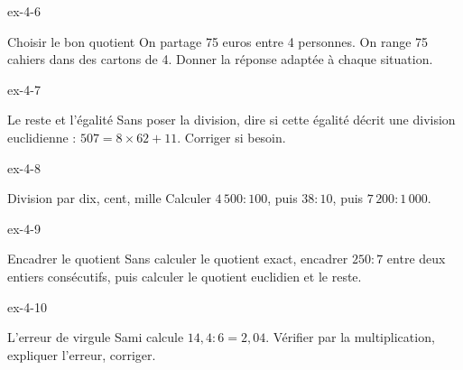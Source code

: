 \begin{blocLivre}{ex-4-6}\begin{exercice}[2]{Choisir le bon quotient}
On partage 75 euros entre 4 personnes. On range 75 cahiers dans des cartons de 4. Donner la réponse adaptée à chaque situation.
\end{exercice}\end{blocLivre}
\begin{blocLivre}{ex-4-7}\begin{exercice}[2]{Le reste et l’égalité}
Sans poser la division, dire si cette égalité décrit une division euclidienne : $507=8\times62+11$. Corriger si besoin.
\end{exercice}\end{blocLivre}
\begin{blocLivre}{ex-4-8}\begin{exercice}[2]{Division par dix, cent, mille}
Calculer $4\,500:100$, puis $38:10$, puis $7\,200:1\,000$.
\end{exercice}\end{blocLivre}
\begin{blocLivre}{ex-4-9}\begin{exercice}[2]{Encadrer le quotient}
Sans calculer le quotient exact, encadrer $250:7$ entre deux entiers consécutifs, puis calculer le quotient euclidien et le reste.
\end{exercice}\end{blocLivre}
\begin{blocLivre}{ex-4-10}\begin{exercice}[2]{L’erreur de virgule}
Sami calcule $14{,}4:6=2{,}04$. Vérifier par la multiplication, expliquer l’erreur, corriger.
\end{exercice}\end{blocLivre}

